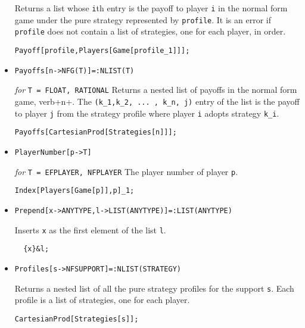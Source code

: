 \begin{itemize}
\bd 
Returns a list whose \verb+i+th entry is the payoff to player \verb+i+
in the normal form game under the pure strategy represented by \verb+profile+.
It is an error if \verb+profile+ does not contain a list of
strategies, one for each player, in order.  
\begin{verbatim}
Payoff[profile,Players[Game[profile_1]]];
\end{verbatim} 
\ed


\item{}
\protect \large \begin{verbatim}
Payoffs[n->NFG(T)]=:NLIST(T)
\end{verbatim}\normalsize

{\it for} {\tt T = FLOAT, RATIONAL} 
\bd 
Returns a nested list of payoffs in the normal form game, verb+n+.
The \verb+(k_1,k_2, ... , k_n, j)+ entry of the list is the payoff to
player \verb+j+ from the strategy profile where player \verb+i+ adopts
strategy \verb+k_i+.
\begin{verbatim}
Payoffs[CartesianProd[Strategies[n]]];
\end{verbatim} 
\ed
  

\item{}
\protect \large \begin{verbatim}
PlayerNumber[p->T]
\end{verbatim}\normalsize

{\it for} {\tt T = EFPLAYER, NFPLAYER}
\bd 
The player number of player \verb+p+.
\begin{verbatim}
Index[Players[Game[p]],p]_1;
\end{verbatim} 
\ed

\item{}
\protect \large \begin{verbatim}
Prepend[x->ANYTYPE,l->LIST(ANYTYPE)]=:LIST(ANYTYPE)
\end{verbatim}\normalsize

\bd 
Inserts \verb+x+ as the first element of the list \verb+l+.  
\begin{verbatim}
  {x}&l;
\end{verbatim} 
\ed

\item{}
\protect \large \begin{verbatim}
Profiles[s->NFSUPPORT]=:NLIST(STRATEGY)
\end{verbatim}\normalsize

\bd 
Returns a nested list of all the pure strategy profiles for the support
\verb+s+.  Each profile is a list of strategies, one for each player.  
\begin{verbatim}
CartesianProd[Strategies[s]];
\end{verbatim} 
\ed



\end{itemize}
